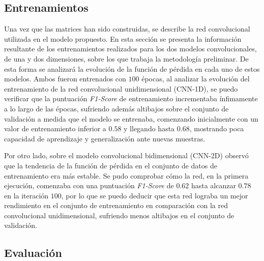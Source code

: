
\subsection*{Entrenamientos}

Una vez que las matrices han sido construidas, se describe la red convolucional utilizada en el modelo propuesto. En esta sección se presenta la información resultante de los entrenamientos realizados para los dos modelos convolucionales, de una y dos dimensiones, sobre los que trabaja la metodología preliminar. De esta forma se analizará la evolución de la función de pérdida en cada uno de estos modelos. Ambos fueron entrenados con $100$ épocas, al analizar la evolución del entrenamiento de la red convolucional unidimensional (CNN-1D), se puedo verificar que la puntuación \textit{F1-Score} de entrenamiento incrementaba ínfimamente a lo largo de las épocas, sufriendo además altibajos sobre el conjunto de validación a medida que el modelo se entrenaba, comenzando inicialmente con un valor de entrenamiento inferior a $0.58$ y llegando hasta $0.68$, mostrando poca capacidad de aprendizaje y generalización ante nuevas muestras.

Por otro lado, sobre el modelo convolucional bidimensional (CNN-2D) observó que la tendencia de la función de pérdida en el conjunto de datos de entrenamiento era más estable. Se pudo comprobar cómo la red, en la primera ejecución, comenzaba con una puntuación \textit{F1-Score} de $0.62$ hasta alcanzar $0.78$ en la iteración $100$, por lo que se puedo deducir que esta red lograba un mejor rendimiento en el conjunto de entrenamiento en comparación con la red convolucional unidimensional, sufriendo menos altibajos en el conjunto de validación.


\subsection*{Evaluación}


